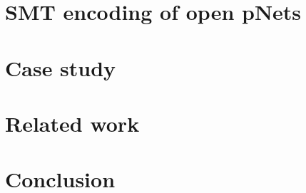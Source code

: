 \documentclass{llncs}
\begin{document}
\section{SMT encoding of open pNets}
\label{secn:smt}


\section{Case study}
\label{secn:case-study}


\section{Related work}
\label{secn:related}


\section{Conclusion}
\label{secn:conclusion}




\end{document}
